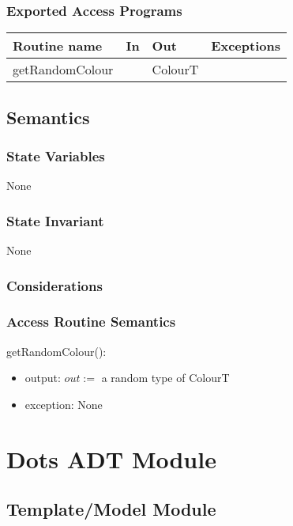 \documentclass[12pt]{article}
\begin{document}
\subsubsection* {Exported Access Programs}

\begin{tabular}{| l | l | l | l |}
\hline
\textbf{Routine name} & \textbf{In} & \textbf{Out} & \textbf{Exceptions}\\
\hline
getRandomColour & ~ & ColourT & \\
\hline
\end{tabular}

\subsection* {Semantics}

\subsubsection* {State Variables}

None

\subsubsection* {State Invariant}

None

\subsubsection* {Considerations}

\newpage

\subsubsection* {Access Routine Semantics}

getRandomColour():
\begin{itemize}
\item output: $out := $ a random type of ColourT
\item exception: None
\end{itemize}


\newpage

\section* {Dots ADT Module}

\subsection*{Template/Model Module}
\end{document}
